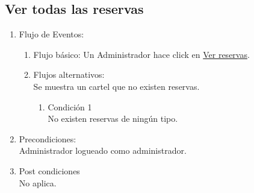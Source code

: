 \documentclass[a4paper,11pt]{article}
\begin{document}
\subsection{Ver todas las reservas}
\begin{enumerate}


    \begin{enumerate}
    \item Descripción breve: \\
        Se listan todas las reservas existentes.
    \item Actores \\
        Administrador.
    \item Disparadores: \\
        Click en el botón \underline{Ver reservas} dentro de la
        página principal del administrador.
    \end{enumerate}

    \item Flujo de Eventos: 

    \begin{enumerate}

        \item Flujo básico:
            Un Administrador hace click en \underline{Ver reservas}.
        \item Flujos alternativos:\\
            Se muestra un cartel que no existen reservas.
            \begin{enumerate}
                \item Condición 1 \\
                    No existen reservas de ningún tipo.
            \end{enumerate}

    \end{enumerate}

    \item Precondiciones: \\
        Administrador logueado como administrador.

    \item Post condiciones \\
        No aplica.

\end{enumerate}
\end{document}
